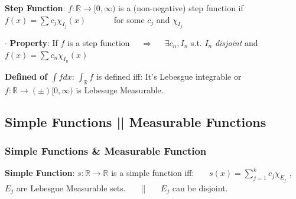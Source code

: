 \documentclass[9pt]{article}
\begin{document}
\textbf{Step Function}: $f:\mathbb{R}\to[0,\infty)$ is a (non-negative) step function if $f(x)=\sum c_j\chi_{I_j}(x)$ \ \ \ \ \ \ for some $c_j$ and $\chi_{I_j}$

$\cdot$ \textbf{Property}: If $f$ is a step function \ \ $\Rightarrow$ \ \ $\exists c_n,I_n$ s.t. $I_n$ \textit{disjoint} and $f(x)=\sum c_n\chi_{I_n}(x)$

\textbf{Defined of $\int fdx$}: $\int_{\mathbb{R}} f$ is defined iff: It's Lebesgue integrable or $f:\mathbb{R}\to(\pm)[0,\infty)$ is Lebesuge Measurable. 


\subsection{Simple Functions || Measurable Functions}

\subsubsection{Simple Functions \& Measurable Function}

\textbf{Simple Function}: $s:\mathbb{R}\to\mathbb{R}$ is a simple function iff: \ \ \ $s(x)=\sum^k_{j=1} c_j\chi_{E_j}$ , {\footnotesize $E_j$ are Lebesgue Measurable sets.} \ \ \ || \ \ \ {\footnotesize $E_j$ can be disjoint.}
\end{document}
